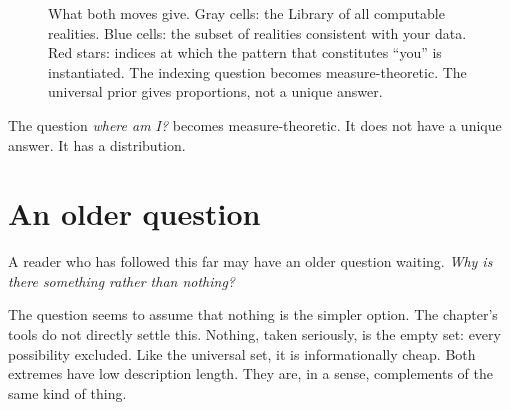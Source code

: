 \begin{figure}[h]
\centering
{}
\caption{What both moves give. Gray cells: the Library of all computable realities. Blue cells: the subset of realities consistent with your data. Red stars: indices at which the pattern that constitutes ``you'' is instantiated. The indexing question becomes measure-theoretic. The universal prior gives proportions, not a unique answer.}
\label{fig:multiplicity}
\end{figure}

The question \emph{where am I?} becomes measure-theoretic. It does not have a unique answer. It has a distribution.

\section*{An older question}

A reader who has followed this far may have an older question waiting. \emph{Why is there something rather than nothing?}

The question seems to assume that nothing is the simpler option. The chapter's tools do not directly settle this. Nothing, taken seriously, is the empty set: every possibility excluded. Like the universal set, it is informationally cheap. Both extremes have low description length. They are, in a sense, complements of the same kind of thing.

